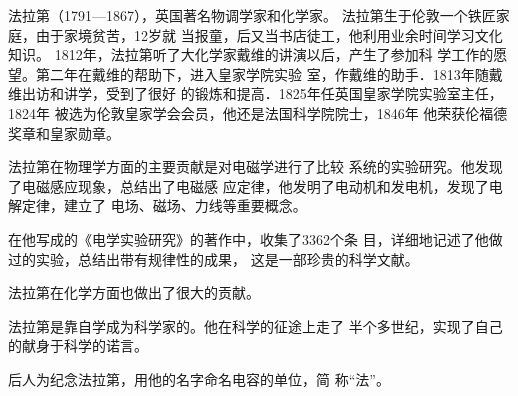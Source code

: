 法拉第（1791—1867），英国著名物调学家和化学家。
法拉第生于伦敦一个铁匠家庭，由于家境贫苦，12岁就
当报童，后又当书店徒工，他利用业余时间学习文化知识。
1812年，法拉第听了大化学家戴维的讲演以后，产生了参加科
学工作的愿望。第二年在戴维的帮助下，进入皇家学院实验
室，作戴维的助手．1813年随戴维出访和讲学，受到了很好
的锻炼和提高．1825年任英国皇家学院实验室主任，1824年
被选为伦敦皇家学会会员，他还是法国科学院院士，1846年
他荣获伦福德奖章和皇家勋章。

法拉第在物理学方面的主要贡献是对电磁学进行了比较
系统的实验研究。他发现了电磁感应现象，总结出了电磁感
应定律，他发明了电动机和发电机，发现了电解定律，建立了
电场、磁场、力线等重要概念。

在他写成的《电学实验研究》的著作中，收集了3362个条
目，详细地记述了他做过的实验，总结出带有规律性的成果，
这是一部珍贵的科学文献。

法拉第在化学方面也做出了很大的贡献。

法拉第是靠自学成为科学家的。他在科学的征途上走了
半个多世纪，实现了自己的献身于科学的诺言。

后人为纪念法拉第，用他的名字命名电容的单位，简
称“法”。


